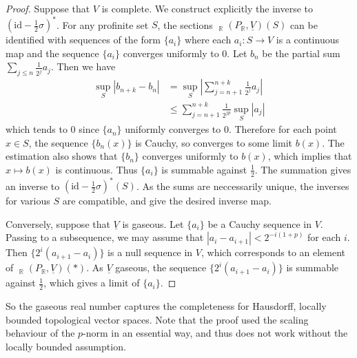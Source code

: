\documentclass{article}
\theoremstyle{plain}
\theoremstyle{definition}
\theoremstyle{remark}
\DeclareMathOperator{\Homs}{\underline{Hom}}
\begin{document}
\begin{proof}
Suppose that $ V $ is complete. We construct explicitly the inverse to $ (\mathrm{id} - \frac{1}{2}\sigma)^{*} $.
For any profinite set $ S $, the sections $ \Homs _{\mathbb{R}}(P _{\mathbb{R}}, \underline{V})(S) $
can be identified with sequences of the form $ \{a _{i}\} $ where each $ a _{i}: S\to V $ is a continuous map
and the sequence $ \{a _{i}\} $ converges uniformly to $ 0 $.
Let $ b _{n} $ be the partial sum $ \sum _{j\leq n} \frac{1}{2 ^{j}} a _{j} $.
Then we have
\begin{align*}
\sup _{S}|b _{n+k} - b _{n}|
&= \sup _{S}|\sum _{j=n+1}^{n+k} \frac{1}{2 ^{j}}a _{j}|\\
&\leq \sum _{j=n+1}^{n+k} \frac{1}{2 ^{jp}} \sup _{S}|a _{j}|
\end{align*}
which tends to $ 0 $ since $ \{a _{n}\} $ uniformly converges to $ 0 $.
Therefore for each point $ x\in S $, the sequence $ \{b _{n}(x)\} $ is Cauchy, so converges to some limit $ b (x) $.
The estimation also shows that $ \{b _{n}\} $ converges uniformly to $ b (x) $,
which implies that $ x\mapsto b (x) $ is continuous.
Thus $ \{a _{i}\} $ is summable against $ \frac{1}{2} $.
The summation gives an inverse to $ (\mathrm{id}-\frac{1}{2}\sigma)^{*}(S) $.
As the sums are neccessarily unique, the inverses for various $ S $ are compatible,
and give the desired inverse map.

Conversely, suppose that $ \underline{V} $ is gaseous.
Let $ \{a _{i}\} $ be a Cauchy sequence in $ V $.
Passing to a subsequence, we may assume that $ |a _{i} - a _{i+1}| < 2 ^{-i(1+p)} $ for each $ i $.
Then $ \{2 ^{i}(a _{i+1}- a _{i})\} $ is a null sequence in $ V $, which corresponds to an element of
$ \Homs _{\mathbb{R}}(P _{\mathbb{R}}, \underline{V})(*) $.
As $ \underline{V} $ gaseous, the sequence $ \{2 ^{i}(a _{i+1}-a _{i})\} $ is summable against $ \frac{1}{2} $,
which gives a limit of $ \{a _{i}\} $.
\end{proof}

So the gaseous real number captures the completeness for Hausdorff, locally bounded topological vector spaces.
Note that the proof used the scaling behaviour of the $ p $-norm in an essential way,
and thus does not work without the locally bounded assumption.
\appendix


\printbibliography
\end{document}
